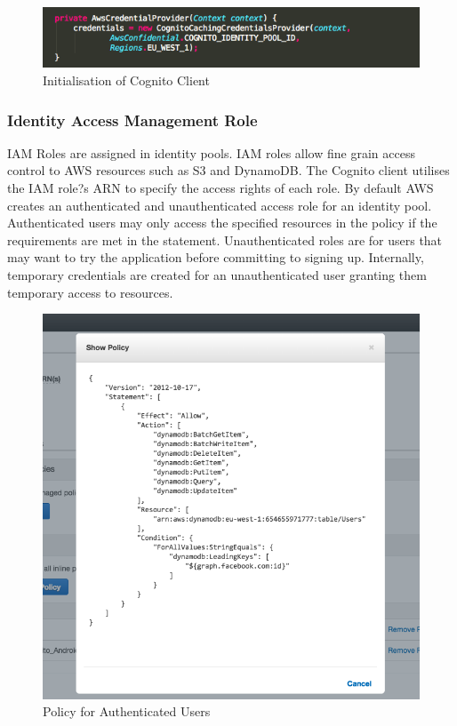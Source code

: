 \documentclass[a4paper, 11pt]{article}
\begin{document}
\begin{figure}[h]
\centering
\includegraphics[width=\textwidth]{cognito_client_code.png}
\caption{Initialisation of Cognito Client}
\end{figure}

\subsubsection{Identity Access Management Role}
IAM Roles are assigned in identity pools. IAM roles allow fine grain access control to AWS resources such as S3 and DynamoDB. The Cognito client utilises the IAM role?s ARN to specify the access rights of each role. By default AWS creates an authenticated and unauthenticated access role for an identity pool. Authenticated users may only access the specified resources in the policy if the requirements are met in the statement. Unauthenticated roles are for users that may want to try the application before committing to signing up. Internally, temporary credentials are created for an unauthenticated user granting them temporary access to resources. 

\begin{figure}[t]
\centering
\includegraphics[width=\textwidth]{iam_policy.png}
\caption{Policy for Authenticated Users}\label{fig:iam}
\end{figure}
\end{document}
